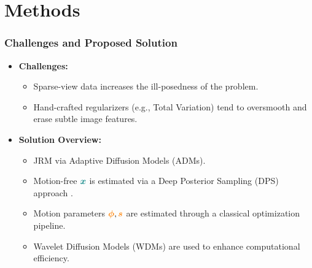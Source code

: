 \section{Methods}

\begin{frame}[t, fragile]
    \frametitle{Challenges and Proposed Solution}

    \begin{itemize}
        \item<1-> \textbf{Challenges:}
              \begin{itemize}
                  \item Sparse-view data increases the ill-posedness of the problem.
                  \item Hand-crafted regularizers (e.g., Total Variation) tend to oversmooth and erase subtle image features.
              \end{itemize}

        \item<2-> \textbf{Solution Overview:}
              \begin{itemize}
                  \item JRM via Adaptive Diffusion Models (ADMs).
                  \item Motion-free $\textcolor{green}{\boldx}$ is estimated via a Deep Posterior Sampling (DPS) approach \cite{zhu2023denoising}.
                  \item Motion parameters $\textcolor{orange}{\bm{\phi}}, \textcolor{orange}{\bm{s}}$ are estimated through a classical optimization pipeline.
                  \item Wavelet Diffusion Models (WDMs) \cite{friedrich2024wdm} are used to enhance computational efficiency.
              \end{itemize}
    \end{itemize}
\end{frame}



